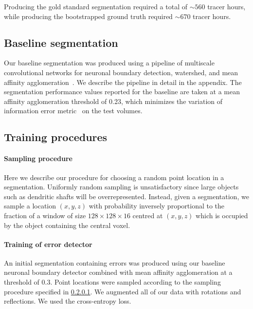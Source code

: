 \documentclass{article}
\begin{document}
Producing the gold standard segmentation required a total of $\sim 560$ tracer hours, while producing the bootstrapped ground truth required $\sim 670$ tracer hours.

\subsection{Baseline segmentation}
Our baseline segmentation was produced using a pipeline of multiscale convolutional networks for neuronal boundary detection, watershed, and mean affinity agglomeration~\cite{kisuk}. We describe the pipeline in detail in the appendix. The segmentation performance values reported for the baseline are taken at a mean affinity agglomeration threshold of 0.23, which minimizes the variation of information error metric~\cite{meila2007,vi} on the test volumes.

\subsection{Training procedures}
\paragraph{Sampling procedure}
\label{sec:sampling}
Here we describe our procedure for choosing a random point location in a segmentation. Uniformly random sampling is unsatisfactory since large objects such as dendritic shafts will be overrepresented. Instead, given a segmentation, we sample a location $(x,y,z)$ with probability inversely proportional to the fraction of a window of size $128 \times 128 \times 16$ centred at $(x,y,z)$ which is occupied by the object containing the central voxel.

\paragraph{Training of error detector}
An initial segmentation containing errors was produced using our baseline neuronal boundary detector combined with mean affinity agglomeration at a threshold of 0.3. Point locations were sampled according to the sampling procedure specified in \ref{sec:sampling}. We augmented all of our data with rotations and reflections. We used the cross-entropy loss.
\end{document}
